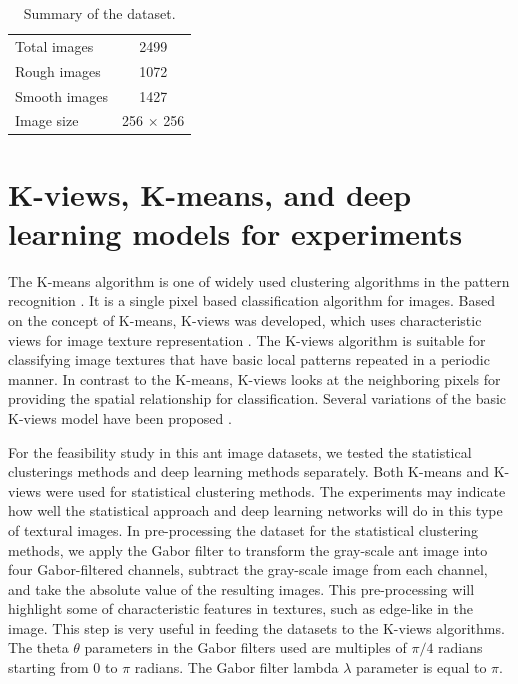 \documentclass{aci}
\numberwithin{equation}{section}
\begin{document}
\begin{table}[h]
    \centering
    \caption{Summary of the dataset.}
    \begin{tabular}{|l|c|}
        \toprule
        Total images  & 2499             \\
        Rough images  & 1072             \\
        Smooth images & 1427             \\
        Image size    & 256 $\times$ 256 \\
        \bottomrule
    \end{tabular}
    \label{tab:dataset-summary}
\end{table}

\section{K-views, K-means, and deep learning models for experiments}


The K-means algorithm is one of widely used clustering algorithms in the pattern
recognition \cite{lloyd_least_1982}. It is a single pixel based classification
algorithm for images. Based on the concept of K-means, K-views was developed,
which uses characteristic views for image texture representation
\cite{hung_use_2002}. The K-views algorithm is suitable for classifying image
textures that have basic local patterns repeated in a periodic manner. In
contrast to the K-means, K-views looks at the neighboring pixels for providing
the spatial relationship for classification.  Several variations of the basic
K-views model have been proposed \cite{yang_image_2003, lan_improved_2010}.

For the feasibility study in this ant image datasets, we tested the statistical
clusterings methods and deep learning methods separately. Both K-means and
K-views were used for statistical clustering methods. The experiments may
indicate how well the statistical approach and deep learning networks will do in
this type of textural images. In pre-processing the dataset for the statistical
clustering methods, we apply the Gabor filter to transform the gray-scale ant
image into four Gabor-filtered channels, subtract the gray-scale image from each
channel, and take the absolute value of the resulting images. This
pre-processing will highlight some of characteristic features in textures, such
as edge-like in the image. This step is very useful in feeding the datasets to
the K-views algorithms. The theta $\theta$ parameters in the Gabor filters used
are multiples of $\pi/4$ radians starting from $0$ to $\pi$ radians. The Gabor
filter lambda $\lambda$ parameter is equal to $\pi$.
\end{document}
